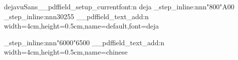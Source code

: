 \documentclass{article}
\begin{document}
\ExplSyntaxOn
{\sffamily 
dejavuSans\__pdffield_setup_currentfont:n {deja}
\int_step_inline:nnn{"800}{"A00}
         {
         }
\int_step_inline:nnn{30}{255}
{
} 
\__pdffield_text_add:n {width=4cm,height=0.5cm,name=default,font=deja}
}

\par %
\int_step_inline:nnn{"6000}{"6500}
         {
         }
\__pdffield_text_add:n {width=4cm,height=0.5cm,name=chinese}

\ExplSyntaxOff
\end{document}
